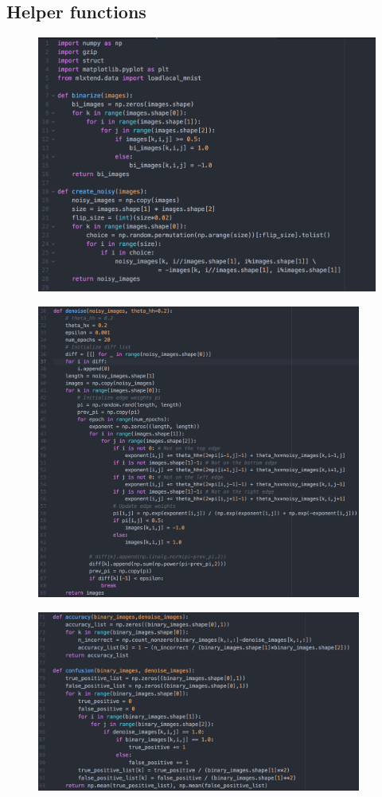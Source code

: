 \documentclass[a4paper]{article}
\begin{document}
\subsection{Helper functions}
\begin{figure}[H]
\centering
\includegraphics[width=1\textwidth]{1.png}
\end{figure}
\begin{figure}[H]
\centering
\includegraphics[width=0.95\textwidth]{2.png}
\end{figure}
\begin{figure}[H]
\centering
\includegraphics[width=0.95\textwidth]{3.png}
\end{figure}
\end{document}
